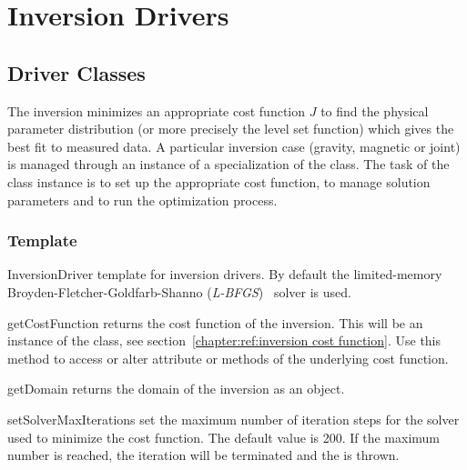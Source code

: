 
\chapter{Inversion Drivers}\label{chapter:ref:Drivers}

\section{Driver Classes}
The inversion minimizes an appropriate cost function $J$ to find the physical parameter distribution 
(or more precisely the level set function) which gives the best fit to measured data. A 
particular inversion case (gravity, magnetic or joint) is managed through 
an instance of a specialization of the  class. The task of the class instance
is to set up the appropriate cost function, to manage solution parameters and to run the optimization process.

\subsection{Template}
\begin{classdesc*}{InversionDriver}
template for inversion drivers. By default the limited-memory Broyden-Fletcher-Goldfarb-Shanno (\emph{L-BFGS})~\cite{L-BFGS} solver is used.
\end{classdesc*}
 
\begin{methoddesc}[InversionDriver]{getCostFunction}{}
returns the cost function of the inversion. This will be an instance of the  class, see section~\ref{chapter:ref:inversion cost function}.
Use this method to access or alter attribute or methods of the underlying cost function.
\end{methoddesc}

\begin{methoddesc}[InversionDriver]{getDomain}{}
returns the domain of the inversion as an \escript {} object.
\end{methoddesc}

        
\begin{methoddesc}[InversionDriver]{setSolverMaxIterations}{}
set the maximum number of iteration steps for the solver used to minimize the cost function. The default value is 200.
If the maximum number is reached, the iteration will be terminated and the  is thrown.
\end{methoddesc}

